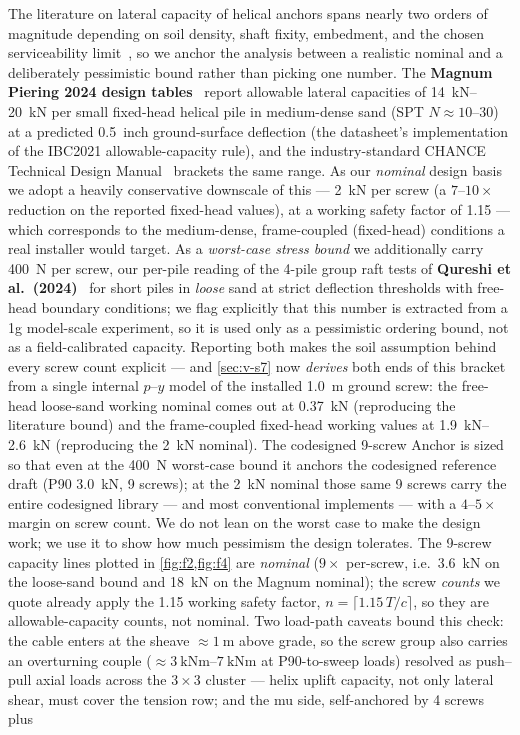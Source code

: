 \documentclass[11pt,a4paper]{article}
\begin{document}
The literature on lateral capacity of helical anchors spans nearly two orders of magnitude depending on soil density, shaft fixity, embedment, and the chosen serviceability limit~\cite{perko2009helical}, so we anchor the analysis between a realistic nominal and a deliberately pessimistic bound rather than picking one number. The \textbf{Magnum Piering 2024 design tables}~\cite{magnum2024fixed} report allowable lateral capacities of \SIrange{14}{20}{\kilo\newton} per small fixed-head helical pile in medium-dense sand (SPT $N \approx 10$--$30$) at a predicted \SI{0.5}{inch} ground-surface deflection (the datasheet's implementation of the IBC2021 allowable-capacity rule), and the industry-standard CHANCE Technical Design Manual~\cite{chance2024manual} brackets the same range. As our \emph{nominal} design basis we adopt a heavily conservative downscale of this --- \SI{2}{\kilo\newton} per screw (a $7$--$10\times$ reduction on the reported fixed-head values), at a working safety factor of 1.15 --- which corresponds to the medium-dense, frame-coupled (fixed-head) conditions a real installer would target. As a \emph{worst-case stress bound} we additionally carry \SI{400}{\newton} per screw, our per-pile reading of the 4-pile group raft tests of \textbf{Qureshi et al.\ (2024)}~\cite{khand2024helical} for short piles in \emph{loose} sand at strict deflection thresholds with free-head boundary conditions; we flag explicitly that this number is extracted from a 1g model-scale experiment, so it is used only as a pessimistic ordering bound, not as a field-calibrated capacity. Reporting both makes the soil assumption behind every screw count explicit --- and \cref{sec:v-s7} now \emph{derives} both ends of this bracket from a single internal $p$--$y$ model of the installed \SI{1.0}{\meter} ground screw: the free-head loose-sand working nominal comes out at \SI{0.37}{\kilo\newton} (reproducing the literature bound) and the frame-coupled fixed-head working values at \SIrange{1.9}{2.6}{\kilo\newton} (reproducing the \SI{2}{\kilo\newton} nominal). The codesigned 9-screw Anchor is sized so that even at the \SI{400}{\newton} worst-case bound it anchors the codesigned reference draft (P90 \SI{3.0}{\kilo\newton}, 9 screws); at the \SI{2}{\kilo\newton} nominal those same 9 screws carry the entire codesigned library --- and most conventional implements --- with a $4$--$5\times$ margin on screw count. We do not lean on the worst case to make the design work; we use it to show how much pessimism the design tolerates. The 9-screw capacity lines plotted in \cref{fig:f2,fig:f4} are \emph{nominal} ($9\times$ per-screw, i.e.\ \SI{3.6}{\kilo\newton} on the loose-sand bound and \SI{18}{\kilo\newton} on the Magnum nominal); the screw \emph{counts} we quote already apply the 1.15 working safety factor, $n = \lceil 1.15\,T / c \rceil$, so they are allowable-capacity counts, not nominal. Two load-path caveats bound this check: the cable enters at the sheave ${\approx}\SI{1}{\meter}$ above grade, so the screw group also carries an overturning couple (${\approx}\SIrange{3}{7}{\kilo\newton\meter}$ at P90-to-sweep loads) resolved as push--pull axial loads across the $3\times3$ cluster --- helix uplift capacity, not only lateral shear, must cover the tension row; and the \gls{mu} side, self-anchored by 4 screws plus 
\end{document}
